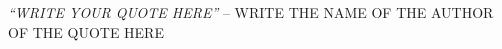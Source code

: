 \thispagestyle{empty}

\null\vfill

\begin{center}
\emph{``WRITE YOUR QUOTE HERE''} -- WRITE THE NAME OF THE AUTHOR OF THE QUOTE HERE
\end{center}

\vspace{10cm}

\clearpage
